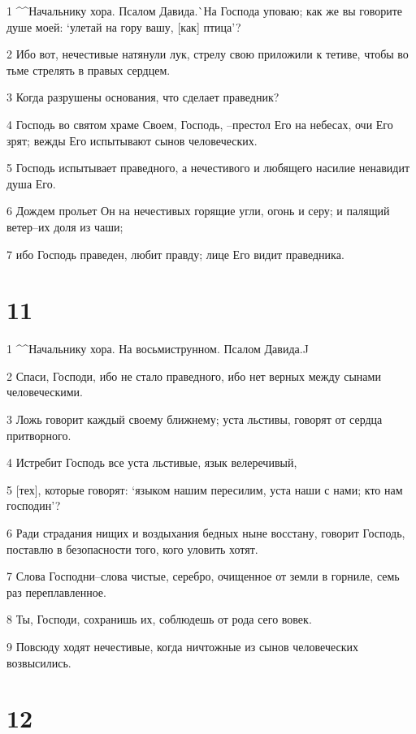 \par 1 ^^Начальнику хора. Псалом Давида.^^ На Господа уповаю; как же вы говорите душе моей: `улетай на гору вашу, [как] птица'?
\par 2 Ибо вот, нечестивые натянули лук, стрелу свою приложили к тетиве, чтобы во тьме стрелять в правых сердцем.
\par 3 Когда разрушены основания, что сделает праведник?
\par 4 Господь во святом храме Своем, Господь, --престол Его на небесах, очи Его зрят; вежды Его испытывают сынов человеческих.
\par 5 Господь испытывает праведного, а нечестивого и любящего насилие ненавидит душа Его.
\par 6 Дождем прольет Он на нечестивых горящие угли, огонь и серу; и палящий ветер--их доля из чаши;
\par 7 ибо Господь праведен, любит правду; лице Его видит праведника.

\chapter{11}

\par 1 ^^Начальнику хора. На восьмиструнном. Псалом Давида.^^
\par 2 Спаси, Господи, ибо не стало праведного, ибо нет верных между сынами человеческими.
\par 3 Ложь говорит каждый своему ближнему; уста льстивы, говорят от сердца притворного.
\par 4 Истребит Господь все уста льстивые, язык велеречивый,
\par 5 [тех], которые говорят: `языком нашим пересилим, уста наши с нами; кто нам господин'?
\par 6 Ради страдания нищих и воздыхания бедных ныне восстану, говорит Господь, поставлю в безопасности того, кого уловить хотят.
\par 7 Слова Господни--слова чистые, серебро, очищенное от земли в горниле, семь раз переплавленное.
\par 8 Ты, Господи, сохранишь их, соблюдешь от рода сего вовек.
\par 9 Повсюду ходят нечестивые, когда ничтожные из сынов человеческих возвысились.

\chapter{12}

